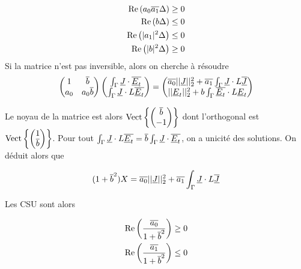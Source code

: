 \begin{align}
\operatorname{Re}\left(a_0{\overline{a_1}}\Delta\right) &\ge 0\\
\operatorname{Re}\left(b\Delta\right) &\le 0\\
\operatorname{Re}\left(|a_1|^2\Delta\right) &\le 0\\
\operatorname{Re}\left(|b|^2\Delta\right) &\ge 0
\end{align}
Si la matrice n'est pas inversible, alors on cherche à résoudre
\[
\begin{pmatrix}
1 & {\overline{b}} \\
a_0 & a_0{\overline{b}}
\end{pmatrix}
\begin{pmatrix}
\int_\Gamma \underline{J} \cdot {\overline{\underline{E}_t}} \\
\int_\Gamma \underline{J}\cdot L{\overline{\underline{E}_t}}
\end{pmatrix}
=
\begin{pmatrix}
{\overline{a_0}}||\underline{J}||_2^2 + {\overline{a_1}}\int_\Gamma \underline{J} \cdot L{\overline{\underline{J}}} \\
||\underline{E}_t||_2^2 + b\int_\Gamma {\overline{\underline{E}_t}} \cdot L\underline{E}_t
\end{pmatrix}
\]

Le noyau de la matrice est alors $\operatorname{Vect}\left\lbrace\begin{pmatrix}{\overline{b}}\\-1\end{pmatrix}\right\rbrace$ dont l'orthogonal est  $\operatorname{Vect}\left\lbrace\begin{pmatrix}1\\{\overline{b}}\end{pmatrix}\right\rbrace$.
Pour tout $\int_\Gamma \underline{J}\cdot L{\overline{\underline{E}_t}} = {\overline{b}} \int_\Gamma \underline{J} \cdot {\overline{\underline{E}_t}} $, on a unicité des solutions. On déduit alors que

\[
(1 + {\overline{b}}^2) X = {\overline{a_0}} ||\underline{J}||_2^2 + {\overline{a_1}}\int_\Gamma \underline{J} \cdot L{\overline{\underline{J}}}
\]

Les CSU sont alors

\begin{align}
\operatorname{Re}\left(\dfrac{{\overline{a_0}}}{1 + {\overline{b}}^2}\right) &\ge 0 \\
\operatorname{Re}\left(\dfrac{{\overline{a_1}}}{1 + {\overline{b}}^2}\right) &\le 0
\end{align}



